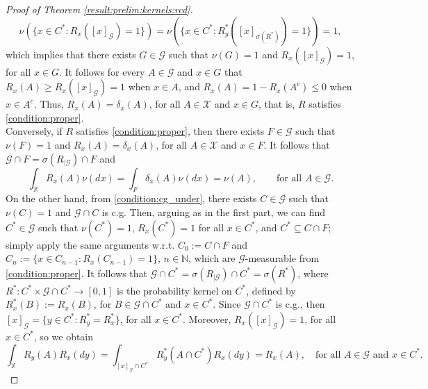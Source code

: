 \documentclass[a4paper]{article}
\theoremstyle{plain}
\theoremstyle{remark}
\theoremstyle{definition}
\begin{document}
\begin{proof}[Proof of Theorem \ref{result:prelim:kernels:rcd}]
\[\nu(\{x\in C^*:R_x([x]_{\mathcal{G}})=1\})=\nu(\{x\in C^*:R_y^*([x]_{\sigma(R^*)})=1\})=1,\]
which implies that there exists $G\in\mathcal{G}$ such that $\nu(G)=1$ and $R_x([x]_{\mathcal{G}})=1$, for all $x\in G$. It follows for every $A\in\mathcal{G}$ and $x\in G$ that $R_x(A)\geq R_x([x]_\mathcal{G})=1$ when $x\in A$, and $R_x(A)=1-R_x(A^c)\leq 0$ when $x\in A^c$. Thus, $R_x(A)=\delta_x(A)$, for all $A\in\mathcal{X}$ and $x\in G$, that is, $R$ satisfies \eqref{condition:proper}.\\

Conversely, if $R$ satisfies \eqref{condition:proper}, then there exists $F\in\mathcal{G}$ such that $\nu(F)=1$ and $R_x(A)=\delta_x(A)$, for all $A\in\mathcal{X}$ and $x\in F$. It follows that $\mathcal{G}\cap F=\sigma(R_{|\mathcal{G}})\cap F$ and
\[\int_\mathbb{X}R_x(A)\nu(dx)=\int_F\delta_x(A)\nu(dx)=\nu(A),\qquad\mbox{for all }A\in\mathcal{G}.\]
On the other hand, from \eqref{condition:cg_under}, there exists $C\in\mathcal{G}$ such that $\nu(C)=1$ and $\mathcal{G}\cap C$ is c.g. Then, arguing as in the first part, we can find $C^*\in\mathcal{G}$ such that $\nu(C^*)=1$, $R_x(C^*)=1$ for all $x\in C^*$, and $C^*\subseteq C\cap F$; simply apply the same arguments w.r.t. $C_0:=C\cap F$ and $C_n:=\{x\in C_{n-1}:R_x(C_{n-1})=1\}$, $n\in\mathbb{N}$, which are $\mathcal{G}$-measurable from \eqref{condition:proper}. It follows that $\mathcal{G}\cap C^*=\sigma(R_{|\mathcal{G}})\cap C^*=\sigma(R^*)$, where $R^*:C^*\times\mathcal{G}\cap C^*\rightarrow[0,1]$ is the probability kernel on $C^*$, defined by $R^*_x(B):=R_x(B)$, for $B\in\mathcal{G}\cap C^*$ and $x\in C^*$. Since $\mathcal{G}\cap C^*$ is c.g., then $[x]_\mathcal{G}=\{y\in C^*:R^*_y=R^*_x\}$, for all $x\in C^*$. Moreover, $R_x([x]_\mathcal{G})=1$, for all $x\in C^*$, so we obtain
\[\int_\mathbb{X}R_y(A)R_x(dy)=\int_{[x]_\mathcal{G}\cap C^*}R^*_y(A\cap C^*)R_x(dy)=R_x(A),\quad\mbox{for all }A\in\mathcal{G}\mbox{ and }x\in C^*.\]
\end{proof}
\end{document}
